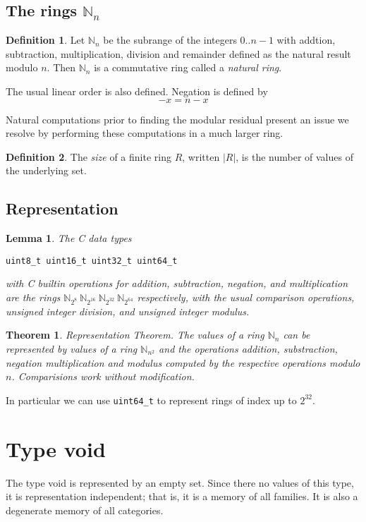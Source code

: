 \documentclass[oneside]{book}
\theoremstyle{plain}
\theoremstyle{definition}
\newtheorem{definition}{Definition}
\theoremstyle{plain}
\newtheorem{lemma}{Lemma}
\newtheorem{theorem}{Theorem}
\begin{document}
\subsection{The rings $\mathbb{N}_n$}
\begin{definition}
Let $\mathbb{N}_n$ be the subrange of the integers $0..n-1$ with 
addtion, subtraction, 
multiplication, division and remainder defined as the natural result modulo $n$.
Then $\mathbb{N}_n$ is a commutative ring called a {\em natural ring}.
\end{definition}

The usual linear order is also defined.  Negation is defined by
$$-x = n - x$$

Natural computations prior to finding the modular residual present an issue
we resolve by performing these computations in a much larger ring.

\begin{definition}
The {\em size} of a finite ring $R$, written $|R|$, is the number of values of the underlying set.
\end{definition}
\subsection{Representation}
\begin{lemma} The C data types
\begin{verbatim}
uint8_t uint16_t uint32_t uint64_t
\end{verbatim}
with C builtin operations for addition, subtraction, negation, and multiplication
are the rings
\(\mathbb{N}_{2^8}\ \mathbb{N}_{2^{16}}\ \mathbb{N}_{2^{32}}\ \mathbb{N}_{2^{64}} \)
respectively, with the usual comparison operations, unsigned integer division,
and unsigned integer modulus.
\end{lemma}

\begin{theorem}
{\em Representation Theorem}. The values of a ring $\mathbb{N}_n$ can be represented
by values of a ring $\mathbb{N}_{n^2}$ and the operations addition, substraction, negation
multiplication and modulus computed by the respective operations modulo $n$. Comparisions
work without modification.
\end{theorem}
In particular we can use \verb$uint64_t$ to represent rings of index up to 
$2^{32}$.

\section{Type void}
The type void is represented by an empty set. Since there no values
of this type, it is representation independent; that is, it is a memory
of all families. It is also a degenerate memory of all categories.
\end{document}
